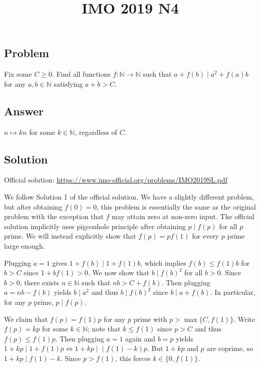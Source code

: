 \documentclass{article}
\title{IMO 2019 N4}
\author{}
\date{}
\newcommand{\N}{\mathbb{N}}
\begin{document}
\maketitle



\subsection*{Problem}

Fix some $C \geq 0$.
Find all functions $f : \N \to \N$ such that $a + f(b) \mid a^2 + f(a) b$ for any $a, b \in \N$ satisfying $a + b > C$.



\subsection*{Answer}

$n \mapsto kn$ for some $k \in \N$, regardless of $C$.



\subsection*{Solution}

Official solution: \url{https://www.imo-official.org/problems/IMO2019SL.pdf}

We follow Solution 1 of the official solution.
We have a slightly different problem, but after obtaining $f(0) = 0$, this problem is essentially the same as the original problem with the exception that $f$ may attain zero at non-zero input.
The official solution implicitly uses pigeonhole principle after obtaining $p \mid f(p)$ for all $p$ prime.
We will instead explicitly show that $f(p) = p f(1)$ for every $p$ prime large enough.

Plugging $a = 1$ gives $1 + f(b) \mid 1 + f(1) b$, which implies $f(b) \leq f(1) b$ for $b > C$ since $1 + b f(1) > 0$.
We now show that $b \mid f(b)^2$ for all $b > 0$.
Since $b > 0$, there exists $n \in \N$ such that $nb > C + f(b)$.
Then plugging $a = nb - f(b)$ yields $b \mid a^2$ and thus $b \mid f(b)^2$ since $b \mid a + f(b)$.
In particular, for any $p$ prime, $p \mid f(p)$.

We claim that $f(p) = f(1) p$ for any $p$ prime with $p > \max\{C, f(1)\}$.
Write $f(p) = kp$ for some $k \in \N$; note that $k \leq f(1)$ since $p > C$ and thus $f(p) \leq f(1) p$.
Then plugging $a = 1$ again and $b = p$ yields $1 + kp \mid 1 + f(1) p \iff 1 + kp \mid (f(1) - k) p$.
But $1 + kp$ and $p$ are coprime, so $1 + kp \mid f(1) - k$.
Since $p > f(1)$, this forces $k \in \{0, f(1)\}$.
\end{document}
